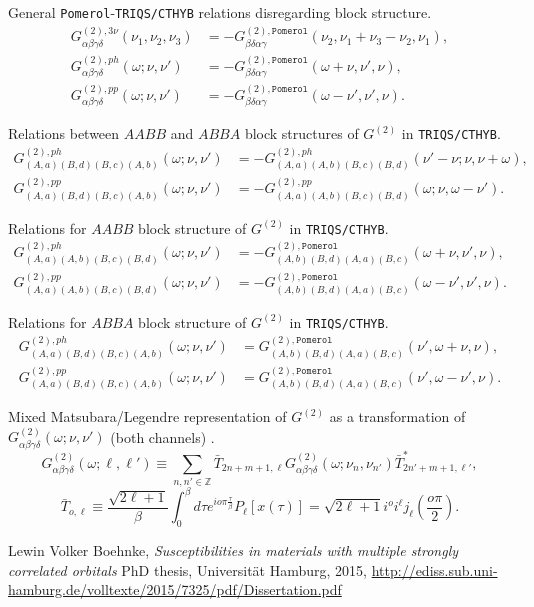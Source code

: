 \documentclass[a4paper,12pt]{article}
\renewcommand{\t}{\ensuremath{\tau}}
\newcommand{\w}{\ensuremath{\omega}}
\newcommand{\n}{\ensuremath{\nu}}
\newcommand{\pom}{\ensuremath{\mathtt{Pomerol}}}
\begin{document}
General \texttt{Pomerol}-\texttt{TRIQS/CTHYB} relations disregarding block
structure.
\begin{align}
	G^{(2),3\nu}_{\alpha\beta\gamma\delta}(\nu_1,\nu_2,\nu_3) &=
	-G^{(2),\pom}_{\beta\delta\alpha\gamma}(\nu_2,\nu_1+\nu_3-\nu_2,\nu_1),\\
	G^{(2),ph}_{\alpha\beta\gamma\delta}(\w;\n,\n') &=
	-G^{(2),\pom}_{\beta\delta\alpha\gamma}(\w+\n,\n',\n),\\
	G^{(2),pp}_{\alpha\beta\gamma\delta}(\w;\n,\n') &=
	-G^{(2),\pom}_{\beta\delta\alpha\gamma}(\w-\n',\n',\n).
\end{align}

Relations between $AABB$ and $ABBA$ block structures of $G^{(2)}$  in
\texttt{TRIQS/CTHYB}.
\begin{align}
G^{(2),ph}_{(A,a)(B,d)(B,c)(A,b)}(\w;\n,\n') &= -
G^{(2),ph}_{(A,a)(A,b)(B,c)(B,d)}(\n'-\n;\n,\n+\w),\\
G^{(2),pp}_{(A,a)(B,d)(B,c)(A,b)}(\w;\n,\n') &= -
G^{(2),pp}_{(A,a)(A,b)(B,c)(B,d)}(\w;\n,\w-\n').
\end{align}

Relations for $AABB$ block structure of $G^{(2)}$ in \texttt{TRIQS/CTHYB}.
\begin{align}
	G^{(2),ph}_{(A,a)(A,b)(B,c)(B,d)}(\w;\n,\n') &=
	-G^{(2),\pom}_{(A,b)(B,d)(A,a)(B,c)}(\w+\n,\n',\n),\\
	G^{(2),pp}_{(A,a)(A,b)(B,c)(B,d)}(\w;\n,\n') &=
	-G^{(2),\pom}_{(A,b)(B,d)(A,a)(B,c)}(\w-\n',\n',\n).
\end{align}

Relations for $ABBA$ block structure of $G^{(2)}$ in \texttt{TRIQS/CTHYB}.
\begin{align}
	G^{(2),ph}_{(A,a)(B,d)(B,c)(A,b)}(\w;\n,\n') &=
	G^{(2),\pom}_{(A,b)(B,d)(A,a)(B,c)}(\n',\w+\n,\n),\\
	G^{(2),pp}_{(A,a)(B,d)(B,c)(A,b)}(\w;\n,\n') &=
	G^{(2),\pom}_{(A,b)(B,d)(A,a)(B,c)}(\n',\w-\n',\n).
\end{align}

Mixed Matsubara/Legendre representation of $G^{(2)}$ as a transformation of
$G^{(2)}_{\alpha\beta\gamma\delta}(\w;\nu,\nu')$ (both channels)
\cite{LewinThesis}.
\begin{equation}\label{legendre_transform}
	G^{(2)}_{\alpha\beta\gamma\delta}(\w;\ell,\ell') \equiv
	\sum_{n,n'\in\mathbb{Z}}
	\bar T_{2n+m+1,\ell}
	G^{(2)}_{\alpha\beta\gamma\delta}(\w;\nu_n,\nu_{n'})
	\bar T^*_{2n'+m+1,\ell'},
\end{equation}
\begin{equation}
	\bar T_{o,\ell} \equiv \frac{\sqrt{2\ell+1}}{\beta}
	\int_0^\beta d\t e^{io\pi\frac{\t}{\beta}} P_\ell[x(\t)] =
	\sqrt{2\ell+1}i^o i^\ell j_\ell\left(\frac{o\pi}{2}\right).
\end{equation}



\begin{thebibliography}{9}
	Lewin Volker Boehnke,
	\emph{Susceptibilities in materials with multiple strongly correlated 
	orbitals}
	PhD thesis, Universit\"at Hamburg, 2015,
	\url{http://ediss.sub.uni-hamburg.de/volltexte/2015/7325/pdf/Dissertation.pdf}
\end{thebibliography}
\end{document}
